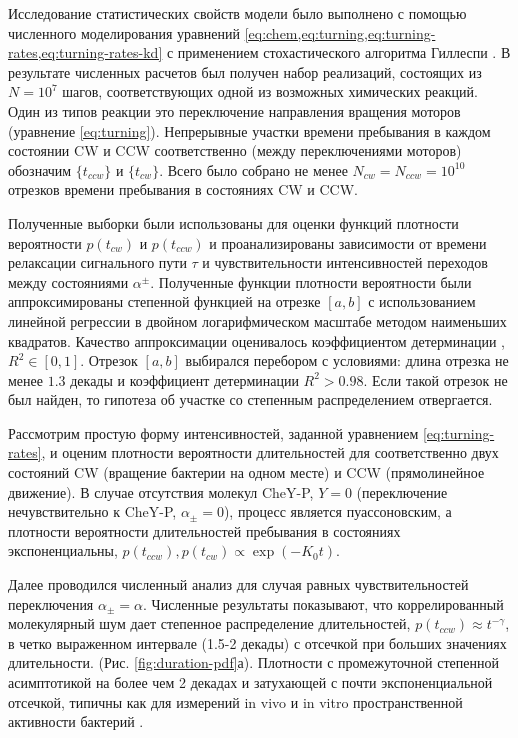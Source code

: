 Исследование статистических свойств модели было выполнено с помощью численного моделирования уравнений \cref{eq:chem,eq:turning,eq:turning-rates,eq:turning-rates-kd} с применением стохастического алгоритма Гиллеспи \cite{gillespie_stochastic_2007}. В результате численных расчетов был получен набор реализаций, состоящих из $N=10^7$ шагов, соответствующих одной из возможных химических реакций. Один из типов реакции это переключение направления вращения моторов (уравнение \cref{eq:turning}). Непрерывные участки времени пребывания в каждом состоянии CW и CCW соответственно (между переключениями моторов) обозначим $\{t_{ccw}\}$ и $\{t_{cw}\}$. Всего было собрано не менее $N_{cw} = N_{ccw} = 10^{10}$ отрезков времени пребывания в состояниях CW и CCW.

Полученные выборки были использованы для оценки функций плотности вероятности $p(t_{cw})$ и $p(t_{ccw})$ и проанализированы зависимости от времени релаксации сигнального пути $\tau$ и чувствительности интенсивностей переходов между состояниями $\alpha^{\pm}$. Полученные функции плотности вероятности были аппроксимированы степенной функцией на отрезке $[a, b]$ с использованием линейной регрессии в двойном логарифмическом масштабе методом наименьших квадратов. Качество аппроксимации оценивалось коэффициентом детерминации \cite{magnus_2021}, $R^2 \in [0, 1]$. Отрезок $[a, b]$ выбирался перебором с условиями: длина отрезка не менее $1.3$ декады и коэффициент детерминации $R^2 > 0.98$. Если такой отрезок не был найден, то гипотеза об участке со степенным распределением отвергается. 

Рассмотрим простую форму интенсивностей, заданной уравнением \cref{eq:turning-rates}, и оценим плотности вероятности длительностей для соответственно двух состояний CW (вращение бактерии на одном месте) и CCW (прямолинейное движение). В случае отсутствия молекул CheY-P, $Y=0$ (переключение нечувствительно к CheY-P, $\alpha_{\pm}=0$), процесс является пуассоновским, а плотности вероятности длительностей пребывания в состояниях экспоненциальны, $p(t_{ccw}), p(t_{cw}) \propto \exp(-K_0 t)$.

Далее проводился численный анализ для случая равных чувствительностей переключения $\alpha_\pm = \alpha$. Численные результаты показывают, что коррелированный молекулярный шум дает степенное распределение длительностей, $p(t_{ccw}) \approx t^{-\gamma}$, в четко выраженном интервале (1.5-2 декады) с отсечкой при больших значениях длительности. (Рис. \cref{fig:duration-pdf}а). Плотности с промежуточной степенной асимптотикой на более чем 2 декадах и затухающей с почти экспоненциальной отсечкой, типичны как для измерений in vivo и in vitro пространственной активности бактерий \cite{korobkova_molecular_2004,harris_generalized_2012}.

